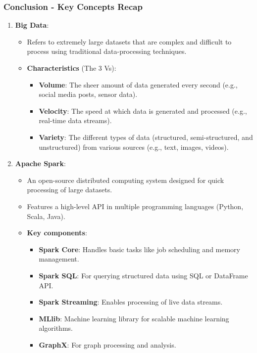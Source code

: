 \documentclass[aspectratio=169]{beamer}
\begin{document}
\begin{frame}[fragile]
    \frametitle{Conclusion - Key Concepts Recap}
    
    \begin{enumerate}
        \item \textbf{Big Data}:
        \begin{itemize}
            \item Refers to extremely large datasets that are complex and difficult to process using traditional data-processing techniques.
            \item \textbf{Characteristics} (The 3 Vs):
            \begin{itemize}
                \item \textbf{Volume}: The sheer amount of data generated every second (e.g., social media posts, sensor data).
                \item \textbf{Velocity}: The speed at which data is generated and processed (e.g., real-time data streams).
                \item \textbf{Variety}: The different types of data (structured, semi-structured, and unstructured) from various sources (e.g., text, images, videos).
            \end{itemize}
        \end{itemize}
        
        \item \textbf{Apache Spark}:
        \begin{itemize}
            \item An open-source distributed computing system designed for quick processing of large datasets.
            \item Features a high-level API in multiple programming languages (Python, Scala, Java).
            \item \textbf{Key components}:
            \begin{itemize}
                \item \textbf{Spark Core}: Handles basic tasks like job scheduling and memory management.
                \item \textbf{Spark SQL}: For querying structured data using SQL or DataFrame API.
                \item \textbf{Spark Streaming}: Enables processing of live data streams.
                \item \textbf{MLlib}: Machine learning library for scalable machine learning algorithms.
                \item \textbf{GraphX}: For graph processing and analysis.
            \end{itemize}
        \end{itemize}
    \end{enumerate}
\end{frame}
\end{document}
